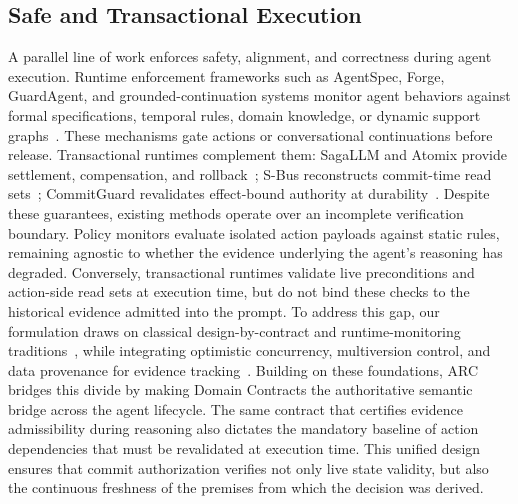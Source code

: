 \subsection{Safe and Transactional Execution}
A parallel line of work enforces safety, alignment, and correctness during agent execution.
Runtime enforcement frameworks such as AgentSpec, Forge, GuardAgent, and grounded-continuation systems monitor agent behaviors against
formal specifications, temporal rules, domain knowledge, or dynamic support graphs~\cite{agentspec,forge,guardagent,groundedcontinuation}.
These mechanisms gate actions or conversational continuations before release.
Transactional runtimes complement them: SagaLLM and Atomix provide settlement, compensation, and rollback~\cite{sagallm,atomix};
S-Bus reconstructs commit-time read sets~\cite{sbus}; CommitGuard revalidates effect-bound authority at durability~\cite{committimeauth}.
Despite these guarantees, existing methods operate over an incomplete verification boundary.
Policy monitors evaluate isolated action payloads against static rules,
remaining agnostic to whether the evidence underlying the agent's reasoning has degraded.
Conversely, transactional runtimes validate live preconditions and action-side read sets at execution time,
but do not bind these checks to the historical evidence admitted into the prompt.
To address this gap, our formulation draws on classical design-by-contract and
runtime-monitoring traditions~\cite{meyer1992contract,schneider2000enforcement,havelund2002monitors},
while integrating optimistic concurrency, multiversion control,
and data provenance for evidence tracking~\cite{kung1981occ,bernstein1983mvcc,buneman2001provenance}.
Building on these foundations, ARC bridges this divide by
making Domain Contracts the authoritative semantic bridge across the agent lifecycle.
The same contract that certifies evidence admissibility during reasoning also dictates
the mandatory baseline of action dependencies that must be revalidated at execution time.
This unified design ensures that commit authorization verifies not only live state validity,
but also the continuous freshness of the premises from which the decision was derived.
